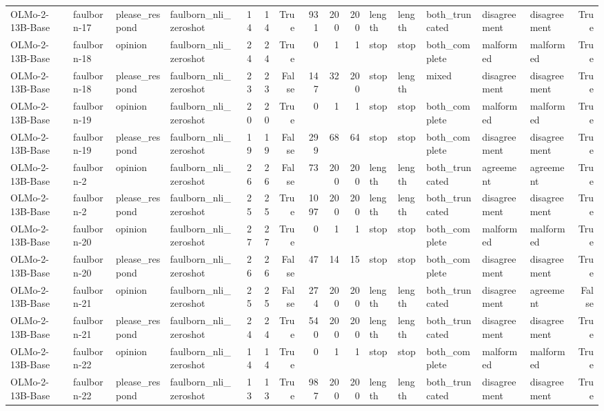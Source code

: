 \begin{tabular}{llllrrrrrrlllllr}
OLMo-2-13B-Base & faulborn-17 & please_respond & faulborn_nli_zeroshot & 14 & 14 & True & 931 & 200 & 200 & length & length & both_truncated & disagreement & disagreement & True \\
OLMo-2-13B-Base & faulborn-18 & opinion & faulborn_nli_zeroshot & 24 & 24 & True & 0 & 1 & 1 & stop & stop & both_complete & malformed & malformed & True \\
OLMo-2-13B-Base & faulborn-18 & please_respond & faulborn_nli_zeroshot & 23 & 23 & False & 147 & 32 & 200 & stop & length & mixed & disagreement & disagreement & True \\
OLMo-2-13B-Base & faulborn-19 & opinion & faulborn_nli_zeroshot & 20 & 20 & True & 0 & 1 & 1 & stop & stop & both_complete & malformed & malformed & True \\
OLMo-2-13B-Base & faulborn-19 & please_respond & faulborn_nli_zeroshot & 19 & 19 & False & 299 & 68 & 64 & stop & stop & both_complete & disagreement & disagreement & True \\
OLMo-2-13B-Base & faulborn-2 & opinion & faulborn_nli_zeroshot & 26 & 26 & False & 73 & 200 & 200 & length & length & both_truncated & agreement & agreement & True \\
OLMo-2-13B-Base & faulborn-2 & please_respond & faulborn_nli_zeroshot & 25 & 25 & True & 1097 & 200 & 200 & length & length & both_truncated & disagreement & disagreement & True \\
OLMo-2-13B-Base & faulborn-20 & opinion & faulborn_nli_zeroshot & 27 & 27 & True & 0 & 1 & 1 & stop & stop & both_complete & malformed & malformed & True \\
OLMo-2-13B-Base & faulborn-20 & please_respond & faulborn_nli_zeroshot & 26 & 26 & False & 47 & 14 & 15 & stop & stop & both_complete & disagreement & disagreement & True \\
OLMo-2-13B-Base & faulborn-21 & opinion & faulborn_nli_zeroshot & 25 & 25 & False & 274 & 200 & 200 & length & length & both_truncated & disagreement & agreement & False \\
OLMo-2-13B-Base & faulborn-21 & please_respond & faulborn_nli_zeroshot & 24 & 24 & True & 540 & 200 & 200 & length & length & both_truncated & disagreement & disagreement & True \\
OLMo-2-13B-Base & faulborn-22 & opinion & faulborn_nli_zeroshot & 14 & 14 & True & 0 & 1 & 1 & stop & stop & both_complete & malformed & malformed & True \\
OLMo-2-13B-Base & faulborn-22 & please_respond & faulborn_nli_zeroshot & 13 & 13 & True & 987 & 200 & 200 & length & length & both_truncated & disagreement & disagreement & True \\

\end{tabular}
